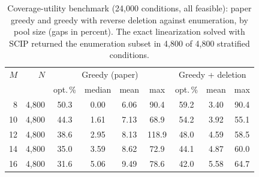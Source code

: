 \begin{table}[!htbp]
\centering
\caption{Coverage-utility benchmark (24{,}000 conditions, all feasible): paper greedy and greedy with reverse deletion against enumeration, by pool size (gaps in percent). The exact linearization solved with SCIP returned the enumeration subset in 4,800 of 4,800 stratified conditions.}
\label{tab:S-coverage}
\footnotesize
\begin{tabular}{@{}rr cccc ccc@{}}
\toprule
$M$ & $N$ & \multicolumn{4}{c}{Greedy (paper)} & \multicolumn{3}{c}{Greedy + deletion} \\ & & opt.\,\% & median & mean & max & opt.\,\% & mean & max \\
\midrule
8 & 4,800 & 50.3 & 0.00 & 6.06 & 90.4 & 59.2 & 3.40 & 90.4 \\
10 & 4,800 & 44.3 & 1.61 & 7.13 & 68.9 & 54.2 & 3.92 & 55.1 \\
12 & 4,800 & 38.6 & 2.95 & 8.13 & 118.9 & 48.0 & 4.59 & 58.5 \\
14 & 4,800 & 35.0 & 3.59 & 8.62 & 72.9 & 44.1 & 4.87 & 60.0 \\
16 & 4,800 & 31.6 & 5.06 & 9.49 & 78.6 & 42.0 & 5.58 & 64.7 \\
\bottomrule
\end{tabular}
\end{table}
